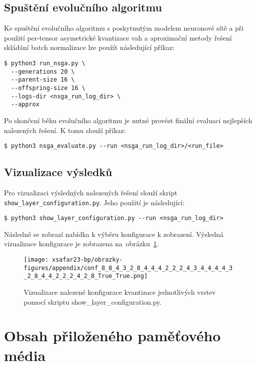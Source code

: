 \section{Spuštění evolučního algoritmu}

Ke spuštění evolučního algoritmu s poskytnutým modelem neuronové sítě a při použití per-tensor asymetrické kvantizace vah a aproximační metody řešení skládání batch normalizace lze použít následující příkaz:
\begin{lstlisting}
$ python3 run_nsga.py \
  --generations 20 \
  --parent-size 16 \
  --offspring-size 16 \
  --logs-dir <nsga_run_log_dir> \
  --approx
\end{lstlisting}

Po skončení běhu evolučního algoritmu je nutné provést finální evaluaci nejlepších nalezených řešení. K tomu slouží příkaz:
\begin{lstlisting}
$ python3 nsga_evaluate.py --run <nsga_run_log_dir>/<run_file>
\end{lstlisting}

\section{Vizualizace výsledků}

Pro vizualizaci výsledných nalezených řešení slouží skript \verb|show_layer_configuration.py|. Jeho použití je následující:
\begin{lstlisting}
$ python3 show_layer_configuration.py --run <nsga_run_log_dir>
\end{lstlisting}

Následně se zobrazí nabídka k výběru konfigurace k zobrazení. Výsledná vizualizace konfigurace je zobrazena na~obrázku~\ref{fig:appendix_a_show_layer_configuration}.

\begin{figure}[hbt]
	\centering
	\texttt{[image: xsafar23-bp/obrazky-figures/appendix/conf\_8\_8\_4\_3\_2\_8\_4\_4\_4\_2\_2\_2\_4\_3\_4\_4\_4\_4\_3\_2\_8\_4\_4\_2\_2\_2\_4\_2\_8\_True\_True.png]}
	\caption{Vizualizace nalezené konfigurace kvantizace jednotlivých vrstev pomocí skriptu show\_layer\_configuration.py.}
	\label{fig:appendix_a_show_layer_configuration} 
\end{figure}

\chapter{Obsah přiloženého paměťového média}

